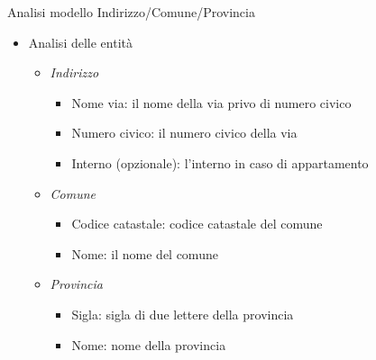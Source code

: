 \begin{frame}{Analisi modello Indirizzo/Comune/Provincia}
    \begin{itemize}
        \item Analisi delle entità
            \begin{itemize}
                \item \textit{Indirizzo}
                    \begin{itemize}
                        \item Nome via: il nome della via privo di numero civico
                        \item Numero civico: il numero civico della via
                        \item Interno (opzionale): l'interno in caso di appartamento
                    \end{itemize}
                \item \textit{Comune}
                    \begin{itemize}
                        \item Codice catastale: codice catastale del comune
                        \item Nome: il nome del comune
                    \end{itemize}
                \item \textit{Provincia}
                    \begin{itemize}
                        \item Sigla: sigla di due lettere della provincia
                        \item Nome: nome della provincia
                    \end{itemize}
            \end{itemize}
    \end{itemize}
\end{frame}

